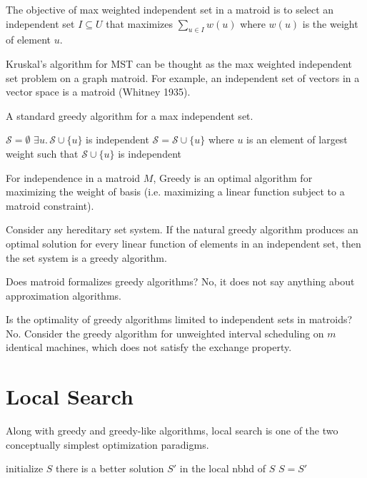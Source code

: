 The objective of max weighted independent set in a matroid is to select an independent set $I \subseteq U$ that maximizes $\sum_{u \in I} w(u)$ where $w(u)$ is the weight of element $u$. 

Kruskal's algorithm for MST can be thought as the max weighted independent set problem on a graph matroid. For example, an independent set of vectors in a vector space is a matroid (Whitney 1935).

A standard greedy algorithm for a max independent set.

\begin{codebox}
    \li $\mathcal{S} = \emptyset$
    \li \While $\exists u.\, \mathcal{S} \cup \{u\}$ is independent \Do
        \li $\mathcal{S} = \mathcal{S} \cup \{u\}$ where $u$ is an element of largest weight such that $\mathcal{S} \cup \{u\}$ is independent
\end{codebox}

\begin{theorem}[Rados]
    For independence in a matroid $M$, Greedy is an optimal algorithm for maximizing the weight of basis (i.e. maximizing a linear function subject to a matroid constraint).
\end{theorem}

\begin{theorem}[Edmonds]
    Consider any hereditary set system. If the natural greedy algorithm produces an optimal solution for every linear function of elements in an independent set, then the set system is a greedy algorithm.
\end{theorem}

Does matroid formalizes greedy algorithms? No, it does not say anything about approximation algorithms.

Is the optimality of greedy algorithms limited to independent sets in matroids? No. Consider the greedy algorithm for unweighted interval scheduling on $m$ identical machines, which does not satisfy the exchange property.

\section{Local Search}

Along with greedy and greedy-like algorithms, local search is one of the two conceptually simplest optimization paradigms.

\begin{codebox}
    \li initialize $S$ 
    \li \While there is a better solution $S'$ in the local nbhd of $S$ \Do
        \li $S = S'$
    \End
\end{codebox}

